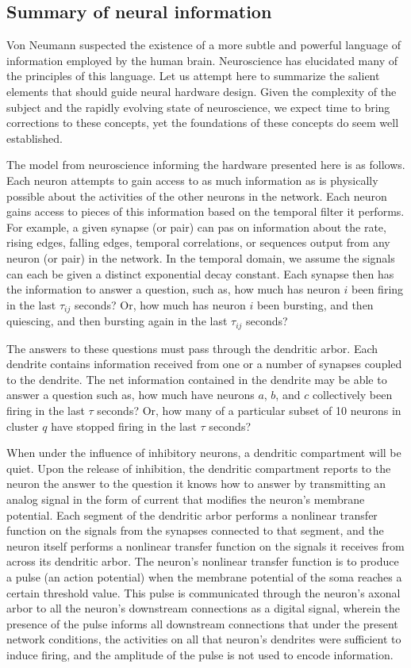 \documentclass[twocolumn]{article}
\begin{document}
\subsection{Summary of neural information}
Von Neumann suspected the existence of a more subtle and powerful language of information employed by the human brain. Neuroscience has elucidated many of the principles of this language. Let us attempt here to summarize the salient elements that should guide neural hardware design. Given the complexity of the subject and the rapidly evolving state of neuroscience, we expect time to bring corrections to these concepts, yet the foundations of these concepts do seem well established.

The model from neuroscience informing the hardware presented here is as follows. Each neuron attempts to gain access to as much information as is physically possible about the activities of the other neurons in the network. Each neuron gains access to pieces of this information based on the temporal filter it performs. For example, a given synapse (or pair) can pas on information about the rate, rising edges, falling edges, temporal correlations, or sequences output from any neuron (or pair) in the network. In the temporal domain, we assume the signals can each be given a distinct exponential decay constant. Each synapse then has the information to answer a question, such as, how much has neuron $i$ been firing in the last $\tau_{ij}$ seconds? Or, how much has neuron $i$ been bursting, and then quiescing, and then bursting again in the last $\tau_{ij}$ seconds? 

The answers to these questions must pass through the dendritic arbor. Each dendrite contains information received from one or a number of synapses coupled to the dendrite. The net information contained in the dendrite may be able to answer a question such as, how much have neurons $a$, $b$, and $c$ collectively been firing in the last $\tau$ seconds? Or, how many of a particular subset of 10 neurons in cluster $q$ have stopped firing in the last $\tau$ seconds? 

When under the influence of inhibitory neurons, a dendritic compartment will be quiet. Upon the release of inhibition, the dendritic compartment reports to the neuron the answer to the question it knows how to answer by transmitting an analog signal in the form of current that modifies the neuron's membrane potential. Each segment of the dendritic arbor performs a nonlinear transfer function on the signals from the synapses connected to that segment, and the neuron itself performs a nonlinear transfer function on the signals it receives from across its dendritic arbor. The neuron's nonlinear transfer function is to produce a pulse (an action potential) when the membrane potential of the soma reaches a certain threshold value. This pulse is communicated through the neuron's axonal arbor to all the neuron's downstream connections as a digital signal, wherein the presence of the pulse informs all downstream connections that under the present network conditions, the activities on all that neuron's dendrites were sufficient to induce firing, and the amplitude of the pulse is not used to encode information.
\end{document}

